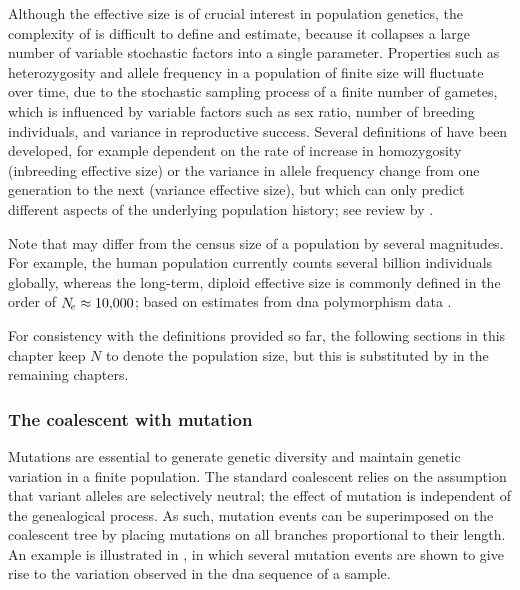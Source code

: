 Although the effective size is of crucial interest in population genetics, the complexity of \Ne is difficult to define and estimate, because it collapses a large number of variable stochastic factors into a single parameter.
Properties such as heterozygosity and allele frequency in a population of finite size will fluctuate over time, due to the stochastic sampling process of a finite number of gametes, which is influenced by variable factors such as sex ratio, number of breeding individuals, and variance in reproductive success.
Several definitions of \Ne have been developed, for example dependent on the rate of increase in homozygosity (inbreeding effective size) or the variance in allele frequency change from one generation to the next (variance effective size), but which can only predict different aspects of the underlying population history; see review by \citet{Wang:2005wy}.

Note that \Ne may differ from the census size of a population by several magnitudes.
For example, the human population currently counts several billion individuals globally, whereas the long-term, diploid effective size is commonly defined in the order of ${N_{\!e} \approx \num{10000}}$; \eg based on estimates from \gls{dna} polymorphism data \citep[\eg][]{Takahata:1993ko,Yu:2001wl}.

For consistency with the definitions provided so far, the following sections in this chapter keep $N$ to denote the population size, but this is substituted by \Ne in the remaining chapters.




%
\subsubsection{The coalescent with mutation}
\label{sec:coal_mutation}
%

Mutations are essential to generate genetic diversity and maintain genetic variation in a finite population.
The standard coalescent relies on the assumption that variant alleles are selectively neutral; \ie the effect of mutation is independent of the genealogical process.
As such, mutation events can be superimposed on the coalescent tree by placing mutations on all branches proportional to their length.
An example is illustrated in , in which several mutation events are shown to give rise to the variation observed in the \gls{dna} sequence of a sample.

%

%

